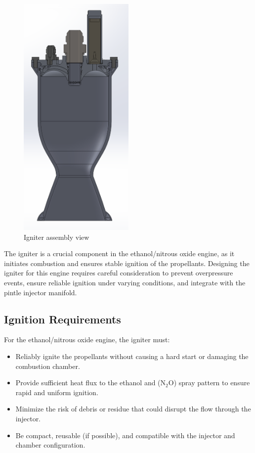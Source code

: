 \begin{figure}[H]
    \centering
    \includegraphics[width=0.5\textwidth]{Images/IgniterView.png}
    \caption{Igniter assembly view}
    \label{fig:igniter}
\end{figure}

The igniter is a crucial component in the ethanol/nitrous oxide engine, as it initiates combustion and ensures stable ignition of the propellants. Designing the igniter for this engine requires careful consideration to prevent overpressure events, ensure reliable ignition under varying conditions, and integrate with the pintle injector manifold.

\subsection{Ignition Requirements}

For the ethanol/nitrous oxide engine, the igniter must:
\begin{itemize}
    \item Reliably ignite the propellants without causing a hard start or damaging the combustion chamber.
    \item Provide sufficient heat flux to the ethanol and (N$_2$O) spray pattern to ensure rapid and uniform ignition.
    \item Minimize the risk of debris or residue that could disrupt the flow through the injector.
    \item Be compact, reusable (if possible), and compatible with the injector and chamber configuration.
\end{itemize}


